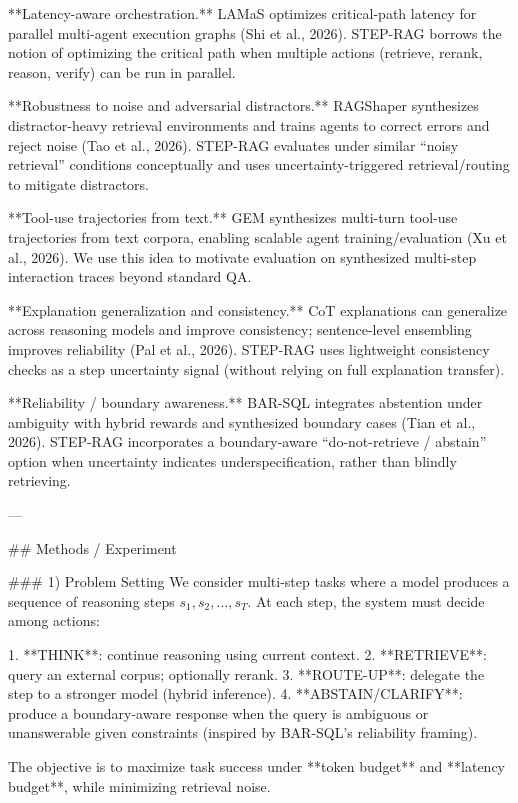 **Latency-aware orchestration.** LAMaS optimizes critical-path latency for parallel multi-agent execution graphs (Shi et al., 2026). STEP-RAG borrows the notion of optimizing the critical path when multiple actions (retrieve, rerank, reason, verify) can be run in parallel.

**Robustness to noise and adversarial distractors.** RAGShaper synthesizes distractor-heavy retrieval environments and trains agents to correct errors and reject noise (Tao et al., 2026). STEP-RAG evaluates under similar “noisy retrieval” conditions conceptually and uses uncertainty-triggered retrieval/routing to mitigate distractors.

**Tool-use trajectories from text.** GEM synthesizes multi-turn tool-use trajectories from text corpora, enabling scalable agent training/evaluation (Xu et al., 2026). We use this idea to motivate evaluation on synthesized multi-step interaction traces beyond standard QA.

**Explanation generalization and consistency.** CoT explanations can generalize across reasoning models and improve consistency; sentence-level ensembling improves reliability (Pal et al., 2026). STEP-RAG uses lightweight consistency checks as a step uncertainty signal (without relying on full explanation transfer).

**Reliability / boundary awareness.** BAR-SQL integrates abstention under ambiguity with hybrid rewards and synthesized boundary cases (Tian et al., 2026). STEP-RAG incorporates a boundary-aware “do-not-retrieve / abstain” option when uncertainty indicates underspecification, rather than blindly retrieving.

---

## Methods / Experiment  

### 1) Problem Setting  
We consider multi-step tasks where a model produces a sequence of reasoning steps \( s_1, s_2, \dots, s_T \). At each step, the system must decide among actions:

1. **THINK**: continue reasoning using current context.  
2. **RETRIEVE**: query an external corpus; optionally rerank.  
3. **ROUTE-UP**: delegate the step to a stronger model (hybrid inference).  
4. **ABSTAIN/CLARIFY**: produce a boundary-aware response when the query is ambiguous or unanswerable given constraints (inspired by BAR-SQL’s reliability framing).

The objective is to maximize task success under **token budget** and **latency budget**, while minimizing retrieval noise.

